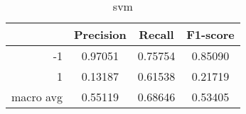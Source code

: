 \begin{table}[!h]
    \centering
    \renewcommand{\arraystretch}{1.5}
    \begin{tabular}{|r|c|c|c|}
        \hline
                  & Precision & Recall & F1-score \\ \hline
        -1        &     0.97051     &     0.75754   &    0.85090      \\ \hline
        1         &     0.13187      &     0.61538   &   0.21719       \\ \hline
        macro avg &      0.55119     &     0.68646   &    0.53405      \\ \hline
    \end{tabular}
    \caption{svm}
\end{table}
